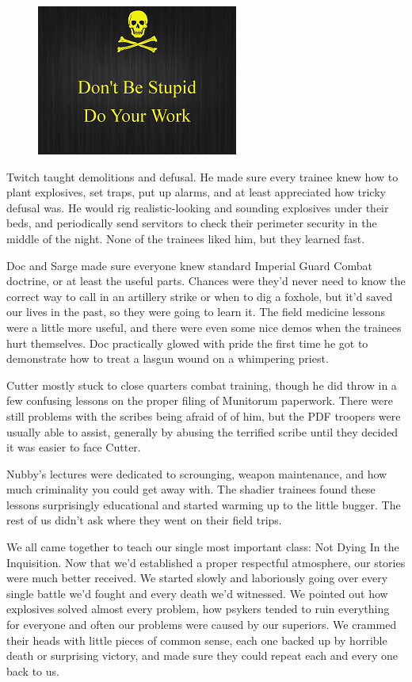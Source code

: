 \begin{figure}
	\begin{center}
		\includegraphics[width=\figwidth]{pics/8/24.png}
	\end{center}
\end{figure}
Twitch taught demolitions and defusal. 
He made sure every trainee knew how to plant explosives, set traps, put up alarms, and at least appreciated how tricky defusal was. 
He would rig realistic-looking and sounding explosives under their beds, and periodically send servitors to check their perimeter security in the middle of the night. 
None of the trainees liked him, but they learned fast.

Doc and Sarge made sure everyone knew standard Imperial Guard Combat doctrine, or at least the useful parts. 
Chances were they’d never need to know the correct way to call in an artillery strike or when to dig a foxhole, but it’d saved our lives in the past, so they were going to learn it. 
The field medicine lessons were a little more useful, and there were even some nice demos when the trainees hurt themselves. 
Doc practically glowed with pride the first time he got to demonstrate how to treat a lasgun wound on a whimpering priest.

Cutter mostly stuck to close quarters combat training, though he did throw in a few confusing lessons on the proper filing of Munitorum paperwork. 
There were still problems with the scribes being afraid of of him, but the PDF troopers were usually able to assist, generally by abusing the terrified scribe until they decided it was easier to face Cutter.

Nubby’s lectures were dedicated to scrounging, weapon maintenance, and how much criminality you could get away with. 
The shadier trainees found these lessons surprisingly educational and started warming up to the little bugger. 
The rest of us didn’t ask where they went on their field trips.

We all came together to teach our single most important class: 
Not Dying In the Inquisition. 
Now that we’d established a proper respectful atmosphere, our stories were much better received. 
We started slowly and laboriously going over every single battle we’d fought and every death we’d witnessed. 
We pointed out how explosives solved almost every problem, how psykers tended to ruin everything for everyone and often our problems were caused by our superiors. 
We crammed their heads with little pieces of common sense, each one backed up by horrible death or surprising victory, and made sure they could repeat each and every one back to us.


